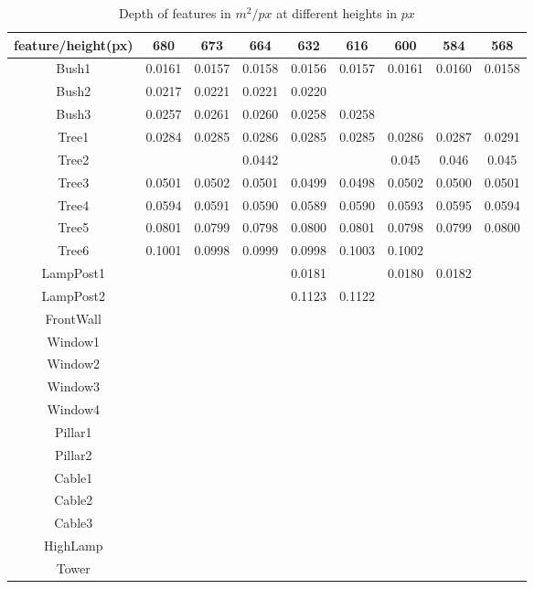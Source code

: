 \begin{table}[!htb]
\centering
    \begin{tabular}{| c | c | c | c | c | c | c | c | c |}
    \hline
    feature/height(px) & 680 & 673 & 664 & 632 & 616 & 600 & 584 & 568 \\ \hline
		 Bush1 & 0.0161 & 0.0157 & 0.0158 & 0.0156 & 0.0157 & 0.0161 & 0.0160 & 0.0158\\ \hline
		 Bush2 & 0.0217 & 0.0221 & 0.0221 & 0.0220 &  &  &  & \\ \hline	
		 Bush3 & 0.0257 & 0.0261 & 0.0260 & 0.0258 & 0.0258 &  &  & \\ \hline	
		 Tree1 & 0.0284 & 0.0285 & 0.0286 & 0.0285 & 0.0285 & 0.0286 & 0.0287 & 0.0291 \\ \hline	
		 Tree2 &  &  & 0.0442  &  &  & 0.045  & 0.046 & 0.045 \\ \hline	
		 Tree3 & 0.0501 & 0.0502 & 0.0501 & 0.0499 & 0.0498 & 0.0502 & 0.0500 & 0.0501\\ \hline	
		 Tree4 & 0.0594 & 0.0591 & 0.0590 & 0.0589 & 0.0590 & 0.0593 & 0.0595 & 0.0594\\ \hline	
		 Tree5 & 0.0801 & 0.0799 & 0.0798 & 0.0800 & 0.0801 & 0.0798 & 0.0799 & 0.0800\\ \hline	
		 Tree6 & 0.1001 & 0.0998 & 0.0999 & 0.0998 & 0.1003 & 0.1002 &  & \\ \hline	
     LampPost1 &  &  & & 0.0181 &  & 0.0180 & 0.0182 &  \\ \hline
		 LampPost2 &  &  &  & 0.1123 & 0.1122  &  &  & \\ \hline
		 FrontWall &  &  &  &  &  &  &  & \\ \hline
		 Window1 &  &  &  &  &  &  &  & \\ \hline
		 Window2 &  &  &  &  &  &  &  & \\ \hline
		 Window3 &  &  &  &  &  &  &  & \\ \hline
		 Window4 &  &  &  &  &  &  &  & \\ \hline
		 Pillar1 &  &  &  &  &  &  &  & \\ \hline
		 Pillar2 &  &  &  &  &  &  &  & \\ \hline
		 Cable1 &  &  &  &  &  &  &  & \\ \hline
	   Cable2 &  &  &  &  &  &  &  & \\ \hline
	   Cable3 &  &  &  &  &  &  &  & \\ \hline
		 HighLamp &  &  &  &  &  &  &  & \\ \hline
	   Tower &  &  &  &  &  &  &  & \\ \hline
    \end{tabular}
		\caption{Depth of features in $m^2/px$ at different heights in $px$}\label{table1}
\end{table}

